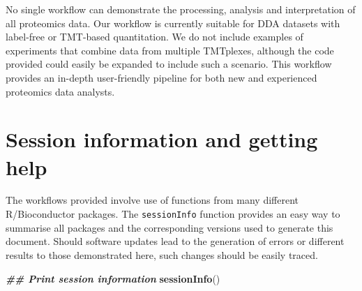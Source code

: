 \documentclass[9pt,a4paper,]{extarticle}
\newenvironment{Shaded}{\begin{snugshade}}{\end{snugshade}}
\newcommand{\DocumentationTok}[1]{\textcolor[rgb]{0.56,0.35,0.01}{\textbf{\textit{#1}}}}
\newcommand{\FunctionTok}[1]{\textcolor[rgb]{0.13,0.29,0.53}{\textbf{#1}}}
\newcommand{\NormalTok}[1]{#1}
\begin{document}
No single workflow can demonstrate the processing, analysis and interpretation
of all proteomics data. Our workflow is currently suitable for DDA datasets with
label-free or TMT-based quantitation. We do not include examples of experiments
that combine data from multiple TMTplexes, although the code provided could
easily be expanded to include such a scenario. This workflow provides an in-depth
user-friendly pipeline for both new and experienced proteomics data analysts.

\section{Session information and getting help}\label{session-information-and-getting-help}

The workflows provided involve use of functions from many different
R/Bioconductor packages. The \texttt{sessionInfo} function provides an easy way to
summarise all packages and the corresponding versions used to generate this
document. Should software updates lead to the generation of errors or different
results to those demonstrated here, such changes should be easily traced.

\begin{Shaded}
\begin{Highlighting}[]
\DocumentationTok{\#\# Print session information}
\FunctionTok{sessionInfo}\NormalTok{()}
\end{Highlighting}
\end{Shaded}
\end{document}
